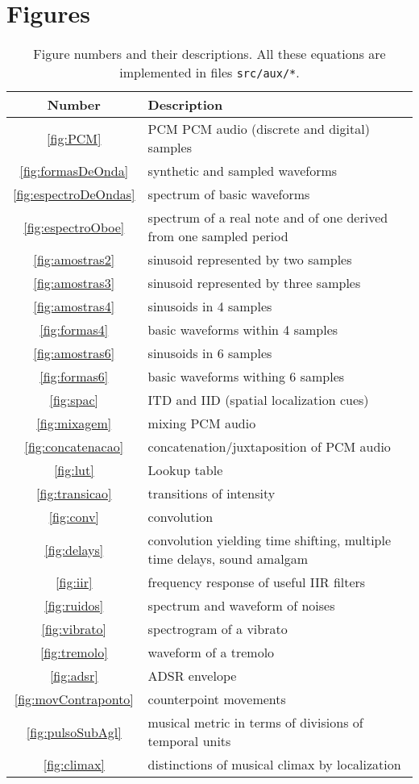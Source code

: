 \documentclass{scrreprt}
\newcommand*{\reff}[1]{%
	{\NoHyper\ref{#1}\endNoHyper}%
	  }
\begin{document}
\clearpage
\section{Figures}\label{sec:lfigures}

\begin{table*}[htp!]
\centering
\caption{Figure numbers and their descriptions.
All these equations are implemented in files \texttt{src/aux/*}.}
\begin{tabular}{ c | p{12cm} }
   Number & Description \\\hline
 \reff{fig:PCM} & PCM PCM audio (discrete and digital) samples \\
 \reff{fig:formasDeOnda} & synthetic and sampled waveforms \\
 \reff{fig:espectroDeOndas} & spectrum of basic waveforms \\
 \reff{fig:espectroOboe} & spectrum of a real note and of one derived from one sampled period \\
 \reff{fig:amostras2} & sinusoid represented by two samples \\
 \reff{fig:amostras3} & sinusoid represented by three samples \\
 \reff{fig:amostras4} & sinusoids in 4 samples \\
 \reff{fig:formas4} & basic waveforms within 4 samples \\
 \reff{fig:amostras6} & sinusoids in 6 samples \\
 \reff{fig:formas6} & basic waveforms withing 6 samples \\
 \reff{fig:spac} & ITD and IID (spatial localization cues)\\
 \reff{fig:mixagem} & mixing PCM audio \\
 \reff{fig:concatenacao} & concatenation/juxtaposition of PCM audio \\
 \reff{fig:lut} & Lookup table \\
 \reff{fig:transicao} & transitions of intensity \\
 \reff{fig:conv} & convolution \\
 \reff{fig:delays} & convolution yielding time shifting, multiple time delays, sound amalgam \\
 \reff{fig:iir} & frequency response of useful IIR filters \\
 \reff{fig:ruidos} & spectrum and waveform of noises \\
 \reff{fig:vibrato} & spectrogram of a vibrato \\
 \reff{fig:tremolo} & waveform of a tremolo \\
 \reff{fig:adsr} & ADSR envelope \\
 \reff{fig:movContraponto} & counterpoint movements \\
 \reff{fig:pulsoSubAgl} & musical metric in terms of divisions of temporal units \\
 \reff{fig:climax} & distinctions of musical climax by localization \\
\end{tabular}
\end{table*}
\end{document}
